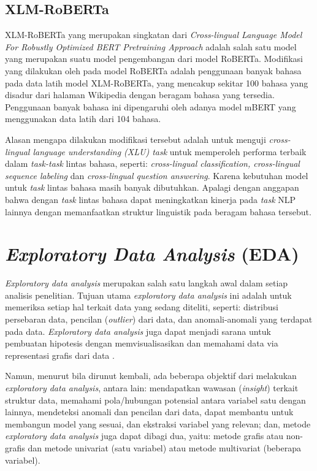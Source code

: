 \subsection{XLM-RoBERTa}
XLM-RoBERTa yang merupakan singkatan dari \emph{Cross-lingual Language Model For Robustly Optimized BERT Pretraining Approach} adalah salah satu model yang merupakan suatu model pengembangan dari model RoBERTa. Modifikasi yang dilakukan oleh \citet{conneau2020unsupervised} pada model RoBERTa adalah penggunaan banyak bahasa pada data latih model XLM-RoBERTa, yang mencakup sekitar 100 bahasa yang disadur dari halaman Wikipedia dengan beragam bahasa yang tersedia. Penggunaan banyak bahasa ini dipengaruhi oleh adanya model mBERT yang menggunakan data latih dari 104 bahasa.

Alasan mengapa dilakukan modifikasi tersebut adalah untuk menguji \emph{cross-lingual language understanding (XLU) task} untuk  memperoleh performa terbaik dalam \emph{task-task} lintas bahasa, seperti: \emph{cross-lingual classification, cross-lingual sequence labeling} dan \emph{cross-lingual question answering}. Karena kebutuhan model untuk \emph{task} lintas bahasa masih banyak dibutuhkan. Apalagi dengan anggapan bahwa dengan \emph{task} lintas bahasa dapat meningkatkan kinerja pada \emph{task} NLP lainnya dengan memanfaatkan struktur linguistik pada beragam bahasa tersebut.

\section{\emph{Exploratory Data Analysis} (EDA)}
\emph{Exploratory data analysis} merupakan salah satu langkah awal dalam setiap analisis penelitian. Tujuan utama \emph{exploratory data analysis} ini adalah untuk memeriksa setiap hal terkait data yang sedang diteliti, seperti: distribusi persebaran data, pencilan (\emph{outlier}) dari data, dan anomali-anomali yang terdapat pada data. \emph{Exploratory data analysis} juga dapat menjadi sarana untuk pembuatan hipotesis dengan memvisualisasikan dan memahami data via representasi grafis dari data \citep{exploratory-data-analysis}. 

Namun, menurut \citet{exploratory-data-analysis} bila dirunut kembali, ada beberapa objektif dari melakukan \emph{exploratory data analysis}, antara lain: mendapatkan wawasan (\emph{insight}) terkait struktur data, memahami pola/hubungan potensial antara variabel satu dengan lainnya, mendeteksi anomali dan pencilan dari data, dapat membantu untuk membangun model yang sesuai, dan ekstraksi variabel yang relevan; dan, metode \emph{exploratory data analysis} juga dapat dibagi dua, yaitu: metode grafis atau non-grafis dan metode univariat (satu variabel) atau metode multivariat (beberapa variabel).


